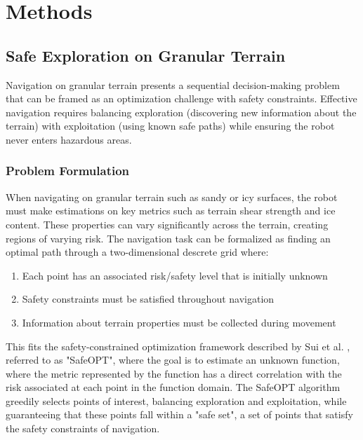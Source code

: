 \chapter{\leavevmode \newline Methods}
\label{chap:Methods}

\section{Safe Exploration on Granular Terrain}
\label{sec:Safe_Exploration_on_Granular_Terrain}

Navigation on granular terrain presents a sequential decision-making problem that can be framed as an optimization challenge with safety constraints. Effective navigation requires balancing exploration (discovering new information about the terrain) with exploitation (using known safe paths) while ensuring the robot never enters hazardous areas.

\subsection{Problem Formulation}
\label{sec:Problem_Formulation}

When navigating on granular terrain such as sandy or icy surfaces, the robot must make estimations on key metrics such as terrain shear strength and ice content. These properties can vary significantly across the terrain, creating regions of varying risk. The navigation task can be formalized as finding an optimal path through a two-dimensional descrete grid where:

\begin{enumerate}
    \item Each point has an associated risk/safety level that is initially unknown
    \item Safety constraints must be satisfied throughout navigation
    \item Information about terrain properties must be collected during movement
\end{enumerate}

This fits the safety-constrained optimization framework described by Sui et al. \cite{safeopt}, referred to as "SafeOPT", where the goal is to estimate an unknown function, where the metric represented by the function has a direct correlation with the risk associated at each point in the function domain. The SafeOPT algorithm greedily selects points of interest, balancing exploration and exploitation, while guaranteeing that these points fall within a "safe set", a set of points that satisfy the safety constraints of navigation. 
